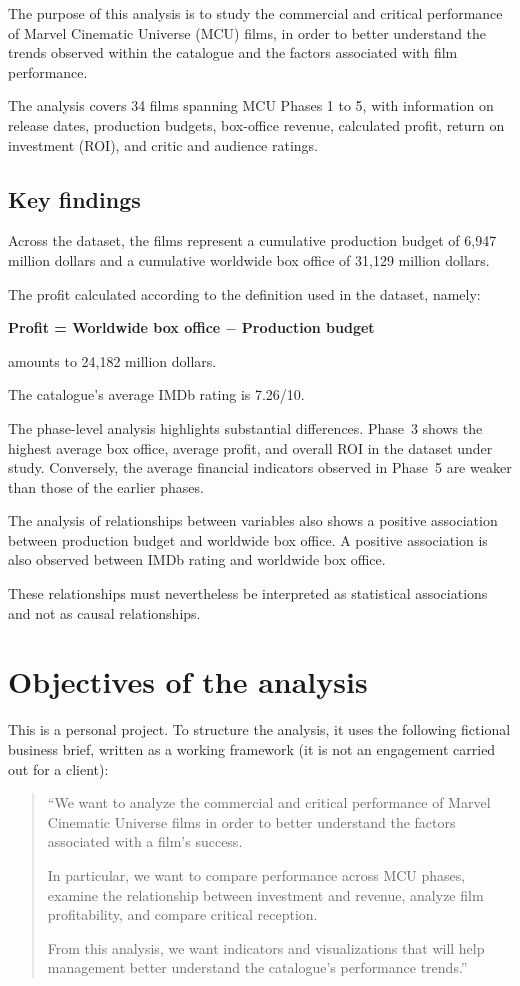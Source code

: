 \documentclass[a4paper,11pt]{article}
\begin{document}
The purpose of this analysis is to study the commercial and critical
performance of Marvel Cinematic Universe (MCU) films, in order to better
understand the trends observed within the catalogue and the factors
associated with film performance.

The analysis covers 34 films spanning MCU Phases 1 to 5, with information
on release dates, production budgets, box-office revenue, calculated
profit, return on investment (ROI), and critic and audience ratings.

\subsection{Key findings}

Across the dataset, the films represent a cumulative production budget of
6,947 million dollars and a cumulative worldwide box office of
31,129 million dollars.

The profit calculated according to the definition used in the dataset,
namely:
\begin{center}
\textbf{Profit = Worldwide box office $-$ Production budget}
\end{center}
amounts to 24,182 million dollars.

The catalogue's average IMDb rating is 7.26/10.

The phase-level analysis highlights substantial differences. Phase~3
shows the highest average box office, average profit, and overall ROI
in the dataset under study. Conversely, the average financial indicators
observed in Phase~5 are weaker than those of the earlier phases.

The analysis of relationships between variables also shows a positive
association between production budget and worldwide box office. A
positive association is also observed between IMDb rating and worldwide
box office.

These relationships must nevertheless be interpreted as statistical
associations and not as causal relationships.

\section{Objectives of the analysis}

This is a personal project. To structure the analysis, it uses the
following fictional business brief, written as a working framework (it is
not an engagement carried out for a client):

\begin{quote}
``We want to analyze the commercial and critical performance of Marvel
Cinematic Universe films in order to better understand the factors
associated with a film's success.

In particular, we want to compare performance across MCU phases, examine
the relationship between investment and revenue, analyze film
profitability, and compare critical reception.

From this analysis, we want indicators and visualizations that will help
management better understand the catalogue's performance trends.''
\end{quote}
\end{document}

